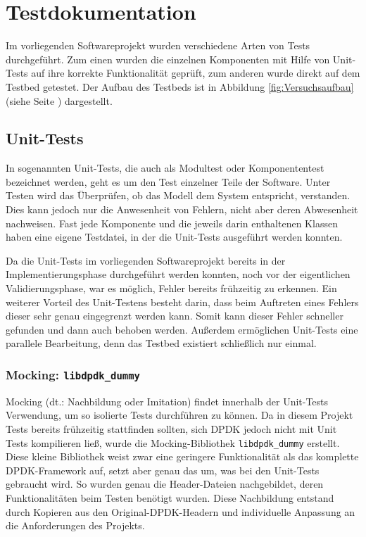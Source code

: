 \documentclass[../review_3.tex]{subfiles}
\begin{document}
\chapter{Testdokumentation}\thispagestyle{fancy}
Im vorliegenden Softwareprojekt wurden verschiedene Arten von Tests durchgeführt. Zum einen wurden die einzelnen Komponenten mit Hilfe von Unit-Tests auf ihre korrekte Funktionalität geprüft, zum anderen wurde direkt auf dem Testbed getestet. Der Aufbau des Testbeds ist in Abbildung \ref{fig:Versuchsaufbau} (siehe Seite \pageref{fig:Versuchsaufbau}) dargestellt.

\section{Unit-Tests}

In sogenannten Unit-Tests, die auch als Modultest oder Komponententest bezeichnet werden, geht es um den Test einzelner Teile der Software. Unter Testen wird das Überprüfen, ob das Modell dem System entspricht, verstanden. Dies kann jedoch nur die Anwesenheit von Fehlern, nicht aber deren Abwesenheit nachweisen. Fast jede Komponente und die jeweils darin enthaltenen Klassen haben eine eigene Testdatei, in der die Unit-Tests ausgeführt werden konnten.

Da die Unit-Tests im vorliegenden Softwareprojekt bereits in der Implementierungsphase durchgeführt werden konnten, noch vor der eigentlichen Validierungsphase, war es möglich, Fehler bereits frühzeitig zu erkennen. Ein weiterer Vorteil des Unit-Testens besteht darin, dass beim Auftreten eines Fehlers dieser sehr genau eingegrenzt werden kann. Somit kann dieser Fehler schneller gefunden und dann auch behoben werden. Außerdem ermöglichen Unit-Tests eine parallele Bearbeitung, denn das Testbed existiert schließlich nur einmal. 

\subsection{Mocking: \texttt{libdpdk\_dummy}}
Mocking (dt.: Nachbildung oder Imitation) findet innerhalb der Unit-Tests Verwendung, um so isolierte Tests durchführen zu können. Da in diesem Projekt Tests bereits frühzeitig stattfinden sollten, sich DPDK jedoch nicht mit Unit Tests kompilieren ließ, wurde die Mocking-Bibliothek \texttt{libdpdk\_dummy} erstellt. Diese kleine Bibliothek weist zwar eine geringere Funktionalität als das komplette DPDK-Framework auf, setzt aber genau das um, was bei den Unit-Tests gebraucht wird. So wurden genau die Header-Dateien nachgebildet, deren Funktionalitäten beim Testen benötigt wurden. Diese Nachbildung entstand durch Kopieren aus den \glqq Original-DPDK-Headern\grqq{} und individuelle Anpassung an die Anforderungen des Projekts.
\end{document}
